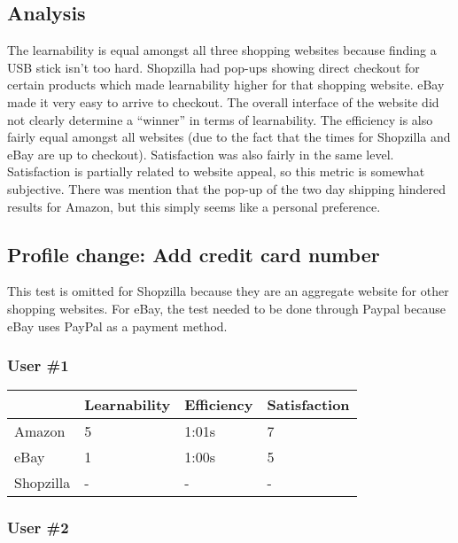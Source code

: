 \documentclass[11pt, oneside]{article}
\begin{document}
\subsection{Analysis}

The learnability is equal amongst all three shopping websites because finding a USB stick isn't too hard. Shopzilla had pop-ups showing direct checkout for certain products which made learnability higher for that shopping website. eBay made it very easy to arrive to checkout. The overall interface of the website did not clearly determine a ``winner'' in terms of learnability. The efficiency is also fairly equal amongst all websites (due to the fact that the times for Shopzilla and eBay are up to checkout). Satisfaction was also fairly in the same level. Satisfaction is partially related to website appeal, so this metric is somewhat subjective. There was mention that the pop-up of the two day shipping hindered results for Amazon, but this simply seems like a personal preference.

\subsection{Profile change: Add credit card number}
    
This test is omitted for Shopzilla because they are an aggregate website for other shopping websites. For eBay, the test needed to be done through Paypal because eBay uses PayPal as a payment method.

\subsubsection{User \#1}

\begin{center}
\begin{tabular}{| l | l | l | l |}
    \hline
     & Learnability & Efficiency & Satisfaction \\ \hline
    Amazon & 5 & 1:01s & 7 \\ \hline
    eBay & 1 & 1:00s & 5 \\ \hline
    Shopzilla & - & - & - \\\hline
\end{tabular}
\end{center}

\subsubsection{User \#2}
\end{document}
